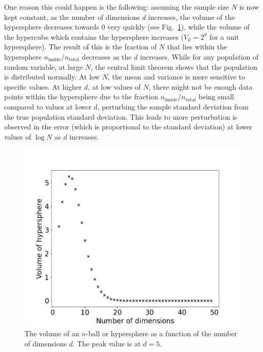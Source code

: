 \documentclass[hyphens,twocolumn,nobalancelastpage,aps,10pt,citeautoscript,longbibliography]{revtex4-2}
\begin{document}
One reason this could happen is the following: assuming the sample size $N$ is
now kept constant, as the number of dimensions $d$ increases, the volume of the
hypersphere decreases towards 0 very quickly (see Fig.~\ref{fig:nball_vol}),
while the volume of the hypercube which contains the hypersphere increases
($V_{\textrm{d}} = 2^d$ for a unit hypersphere). The result of this is the
fraction of $N$ that lies within the hypersphere
$n_{\textrm{inside}}/n_{\textrm{total}}$ decreases as the $d$ increases. While
for any population of random variable, at large $N$, the central limit theorem
shows that the population is distributed normally. At low $N$, the mean and
variance is more sensitive to specific values. At higher $d$, at low values of
$N$, there might not be enough data points within the hypersphere due to the
fraction $n_\textrm{inside}/n_\textrm{total}$ being small compared to values at
lower $d$, perturbing the sample standard deviation from the true population
standard deviation. This leads to more perturbation is observed in the error
(which is proportional to the standard deviation) at lower values of $\log{N}$
as $d$ increases.

\begin{figure}[htpb] \centering
	\includegraphics[width=1\linewidth]{./assets/monte_carlo/nball_vol.png}
	\caption{The volume of an $n$-ball or hypersphere as a function of the number of dimensions $d$. The peak value is at $d = 5$.}%
	\label{fig:nball_vol}
\end{figure}
\end{document}
